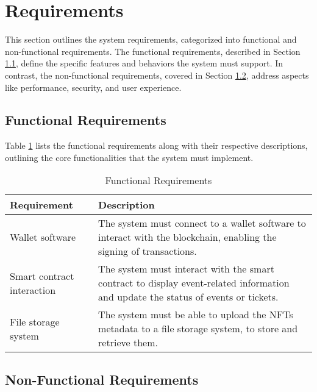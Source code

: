 \section{Requirements}
\label{sec:requirements}

This section outlines the system requirements, categorized into functional and
non-functional requirements. The functional requirements, described in Section
\ref{subsec:functional_requirements}, define the specific features and
behaviors the system must support. In contrast, the non-functional
requirements, covered in Section \ref{subsec:non_functional_requirements},
address aspects like performance, security, and user experience.

\subsection{Functional Requirements}
\label{subsec:functional_requirements}

Table \ref{tab:functional_requirements} lists the functional requirements along
with their respective descriptions, outlining the core functionalities that the
system must implement.

\begin{table}[H]
    \centering
    \begin{tabularx}{\textwidth}{lX}
        \hline
        \textbf{Requirement}       & \textbf{Description}                                                                                                              \\
        \hline
        Wallet software            & The system must connect to a wallet software to interact with the blockchain, enabling the signing of transactions.               \\
        \hline
        Smart contract interaction & The system must interact with the smart contract to display event-related information and update the status of events or tickets. \\
        \hline
        File storage system        & The system must be able to upload the NFTs metadata to a file storage system, to store and retrieve them.                         \\
        \hline
    \end{tabularx}
    \caption{Functional Requirements}
    \label{tab:functional_requirements}
\end{table}

\subsection{Non-Functional Requirements}
\label{subsec:non_functional_requirements}

